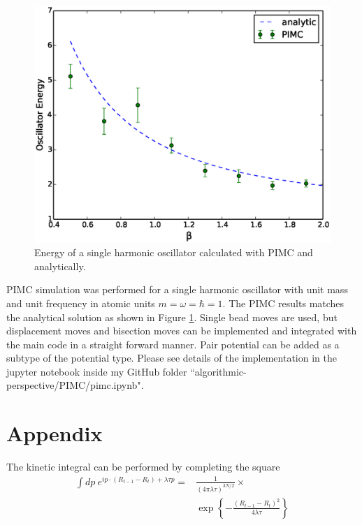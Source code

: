 \documentclass[prl,reprint]{revtex4-1}
\begin{document}
\begin{figure}[h]
\centering
\includegraphics[scale=.4]{figures/single-harmonic}
\caption{Energy of a single harmonic oscillator calculated with PIMC and analytically.\label{fig:single-harmonic}}
\end{figure}

PIMC simulation was performed for a single harmonic oscillator with unit mass and unit frequency in atomic units $m=\omega=\hbar=1$. The PIMC results matches the analytical solution as shown in Figure \ref{fig:single-harmonic}. Single bead moves are used, but displacement moves and bisection moves can be implemented and integrated with the main code in a straight forward manner. Pair potential can be added as a subtype of the potential type. Please see details of the implementation in the jupyter notebook inside my GitHub folder ``algorithmic-perspective/PIMC/pimc.ipynb". 

\section{Appendix}
The kinetic integral can be performed by completing the square
\begin{align*}
\int dp~e^{ip\cdot(R_{t-1}-R_t)+\lambda\tau p} =& \frac{1}{(4\pi\lambda\tau)^{3N/2}}\times \\
&\exp\left\{-\frac{(R_{t-1}-R_t)^2}{4\lambda\tau}\right\}
\end{align*}



\end{document}
